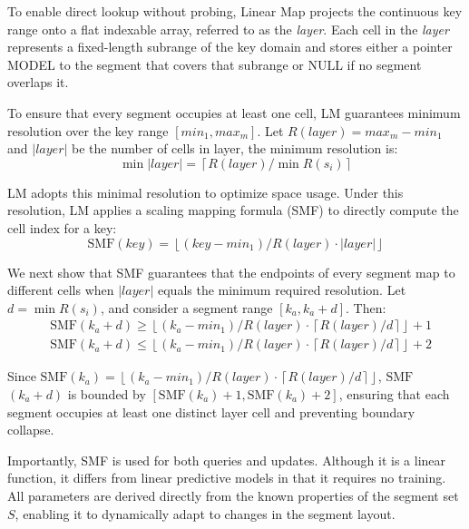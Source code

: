 To enable direct lookup without probing, Linear Map projects the continuous key range onto a flat indexable array, referred to as the \textit{layer}. Each cell in the \textit{layer} represents a fixed-length subrange of the key domain and stores either a pointer MODEL to the segment that covers that subrange or NULL if no segment overlaps it.

To ensure that every segment occupies at least one cell, LM guarantees minimum resolution over the key range $[min_1, max_m]$. Let $R(layer) = max_m - min_1$ and $|layer|$ be the number of cells in layer, the minimum resolution is:
$$
\min |layer| = \left\lceil R(layer) / \min R(s_i) \right\rceil
$$

LM adopts this minimal resolution to optimize space usage. Under this resolution, LM applies a scaling mapping formula (SMF) to directly compute the cell index for a key:
$$
\text{SMF}(key) = \left\lfloor (key - min_1) / R(layer) \cdot |layer| \right\rfloor
$$

We next show that SMF guarantees that the endpoints of every segment map to different cells when $|layer|$ equals the minimum required resolution. Let $d = \min R(s_i)$, and consider a segment range $[k_a, k_a + d]$. Then:
$$
\begin{aligned}
&\text{SMF}(k_a + d) \geq \left\lfloor (k_a - min_1) / R(layer) \cdot \left\lceil R(layer) / d \right\rceil\right\rfloor + 1 \\
&\text{SMF}(k_a + d) \le \left\lfloor (k_a - min_1) / R(layer) \cdot \left\lceil R(layer) / d \right\rceil \right\rfloor + 2
\end{aligned}
$$

Since $\text{SMF}(k_a) = \left\lfloor (k_a - min_1) / R(layer) \cdot \left\lceil R(layer) / d \right\rceil\right\rfloor$, $\text{SMF}$ $(k_a + d)$ is bounded by $[\text{SMF}(k_a) + 1, \text{SMF}(k_a) + 2]$, ensuring that each segment occupies at least one distinct layer cell and preventing boundary collapse.

Importantly, SMF is used for both queries and updates. Although it is a linear function, it differs from linear predictive models in that it requires no training. All parameters are derived directly from the known properties of the segment set $S$, enabling it to dynamically adapt to changes in the segment layout.

